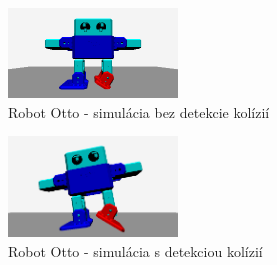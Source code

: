 \begin{figure}
\centerline{\includegraphics[width=0.4\textwidth]{images/otto-without-collision}}
\caption[Robot Otto - simulácia bez detekcie kolízií]{Robot Otto - simulácia bez detekcie kolízií}
\label{obr:otto-without-collision}
\end{figure}

\begin{figure}
\centerline{\includegraphics[width=0.4\textwidth]{images/otto-with-collision}}
\caption[Robot Otto - simulácia s detekciou kolízií]{Robot Otto - simulácia s detekciou kolízií}
\label{obr:otto-with-collision}
\end{figure}














